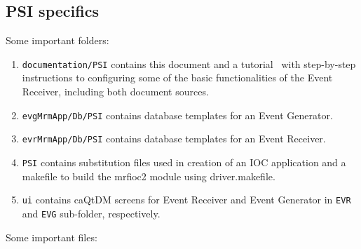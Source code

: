 \documentclass[12pt,a4paper]{article}
\begin{document}
\subsection{PSI specifics}\label{sec:PSI specifics}
Some important folders:
\begin{enumerate}
\item 
	\texttt{documentation/PSI} contains this document and a tutorial~\cite{tutorial} with step-by-step instructions to configuring some of the basic functionalities of the Event Receiver, including both document sources.
\item 
	\texttt{evgMrmApp/Db/PSI} contains database templates for an Event Generator.\label{itm:folder:evg_db}

\item 
	\texttt{evrMrmApp/Db/PSI} contains database templates for an Event Receiver.\label{itm:folder:evr_db}

\item 
	\texttt{PSI} contains substitution files used in creation of an IOC application and a makefile to build the mrfioc2 module using driver.makefile.\label{itm:folder:psi}
\item 
	\texttt{ui} contains caQtDM screens for Event Receiver and Event Generator in \texttt{EVR} and \texttt{EVG} sub-folder, respectively.
\end{enumerate}
Some important files:
\end{document}
